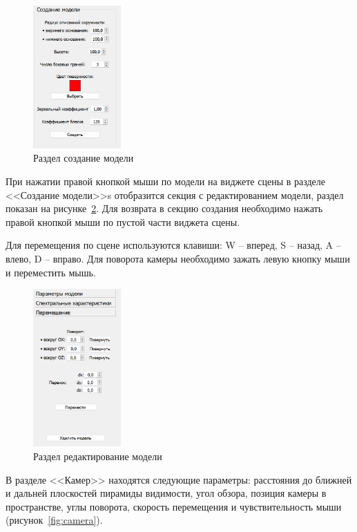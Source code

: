 \begin{figure}[h]
	\centering
	\includegraphics[width=0.3\textwidth]{img/examples/create.png}
	\caption{Раздел создание модели}
	\label{fig:create}
\end{figure}

При нажатии правой кнопкой мыши по модели на виджете сцены в разделе <<Создание модели>>s отобразится секция с редактированием модели, раздел показан на рисунке~\ref{fig:change-model}. 
Для возврата в секцию создания необходимо нажать правой кнопкой мыши по пустой части виджета сцены.

Для перемещения по сцене используются клавиши: W – вперед, S – назад, A – влево, D – вправо. Для поворота камеры необходимо зажать левую кнопку мыши и переместить мышь.

\clearpage
\begin{figure}[h]
	\centering
	\includegraphics[width=0.3\textwidth]{img/examples/change-model.png}
	\caption{Раздел редактирование модели}
	\label{fig:change-model}
\end{figure}

В разделе <<Камер>> находятся следующие параметры: расстояния до ближней и дальней плоскостей пирамиды видимости, угол обзора, позиция камеры в пространстве, углы поворота, скорость перемещения и чувствительность мыши (рисунок~\ref{fig:camera}).


